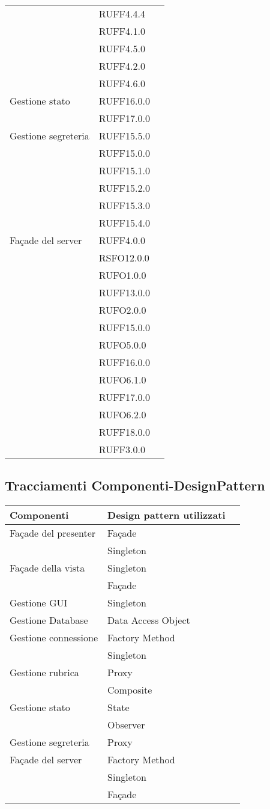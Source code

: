 \begin{center}
\begin{longtable}{lp{}l}
 & RUFF4.4.4 \\
 & RUFF4.1.0 \\
 & RUFF4.5.0 \\
 & RUFF4.2.0 \\
 & RUFF4.6.0 \\
Gestione stato & RUFF16.0.0 \\
 & RUFF17.0.0 \\
Gestione segreteria & RUFF15.5.0 \\
 & RUFF15.0.0 \\
 & RUFF15.1.0 \\
 & RUFF15.2.0 \\
 & RUFF15.3.0 \\
 & RUFF15.4.0 \\
Façade del server & RUFF4.0.0 \\
 & RSFO12.0.0 \\
 & RUFO1.0.0 \\
 & RUFF13.0.0 \\
 & RUFO2.0.0 \\
 & RUFF15.0.0 \\
 & RUFO5.0.0 \\
 & RUFF16.0.0 \\
 & RUFO6.1.0 \\
 & RUFF17.0.0 \\
 & RUFO6.2.0 \\
 & RUFF18.0.0 \\
 & RUFF3.0.0 \\
\bottomrule
\end{longtable}
\end{center}
\subsection{Tracciamenti Componenti-DesignPattern}

\begin{center}
\begin{longtable}{lp{}l}
\toprule Componenti & Design pattern utilizzati\\
\midrule
Façade del presenter & Façade \\
 & Singleton \\
Façade della vista & Singleton \\
 & Façade \\
Gestione GUI & Singleton \\
Gestione Database & Data Access Object \\
Gestione connessione & Factory Method \\
 & Singleton \\
Gestione rubrica & Proxy \\
 & Composite \\
Gestione stato & State \\
 & Observer \\
Gestione segreteria & Proxy \\
Façade del server & Factory Method \\
 & Singleton \\
 & Façade \\
\bottomrule
\end{longtable}
\end{center}
